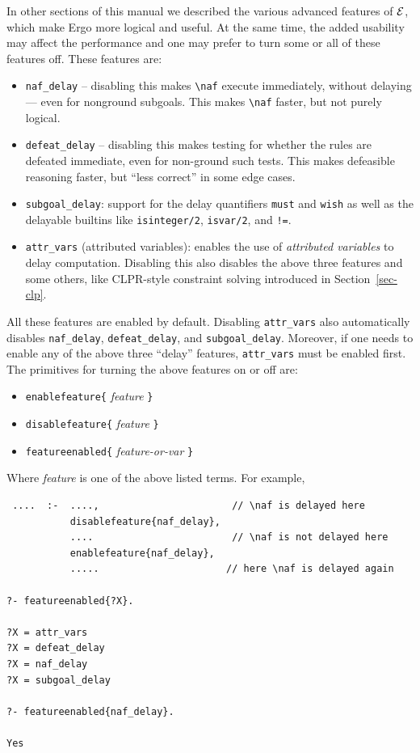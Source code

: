 \documentclass[11pt]{article}
\newcommand{\ERGO}{\mbox{\ensuremath{\cal{E}}\smaller{{\sc{RGO}}}}\xspace}
\newcommand{\bs}{\textbackslash}
\newcommand{\RULELOGNAF}{{\texttt{{\bs}naf}}\xspace}
\begin{document}
In other sections  of this manual we described the various advanced
features of \ERGO, which make Ergo more logical and 
useful. At the same time, the added usability may affect the performance
and one may prefer to turn some or all of these features off.
These features are:
\begin{itemize}
\item \texttt{naf\_delay} --  disabling this makes \texttt{\RULELOGNAF}
  execute immediately, without delaying --- even for nonground subgoals. 
  This makes \texttt{\RULELOGNAF} faster, but not purely  logical.
\item \texttt{defeat\_delay} -- disabling this makes testing for whether
  the rules are  defeated immediate, even for non-ground such tests.
  This makes defeasible reasoning faster, but ``less correct''
  in some edge cases.
\item \texttt{subgoal\_delay}: support for the delay quantifiers
  \texttt{must} and \texttt{wish} as well as the delayable builtins like
  \texttt{isinteger/2}, \texttt{isvar/2}, and \texttt{!=}.
\item \texttt{attr\_vars} (attributed variables): enables the use of
  \emph{attributed  variables}  to delay computation. Disabling this also
  disables the above three features and some others, like CLPR-style
  constraint solving introduced in Section~\ref{sec-clp}.
\end{itemize}
All these features are enabled by default.
Disabling \texttt{attr\_vars} also automatically disables 
\texttt{naf\_delay}, \texttt{defeat\_delay}, and \texttt{subgoal\_delay}.
Moreover, if one needs to enable any  of the above three ``delay'' features,
\texttt{attr\_vars} must be enabled first.
The primitives for turning the above features on or off are:
\begin{itemize}
\item  \texttt{enablefeature\{} \emph{feature} \texttt{\}}   
\item  \texttt{disablefeature\{} \emph{feature} \texttt{\}}   
\item \texttt{featureenabled\{}  \emph{feature-or-var} \texttt{\}}  
\end{itemize}
Where \emph{feature}   is one of the above listed terms.
For example,
\begin{verbatim}
 ....  :-  ....,                       // \naf is delayed here
           disablefeature{naf_delay},
           ....                        // \naf is not delayed here
           enablefeature{naf_delay},
           .....                      // here \naf is delayed again

?- featureenabled{?X}.

?X = attr_vars
?X = defeat_delay
?X = naf_delay
?X = subgoal_delay

?- featureenabled{naf_delay}.

Yes
\end{verbatim}
\end{document}
